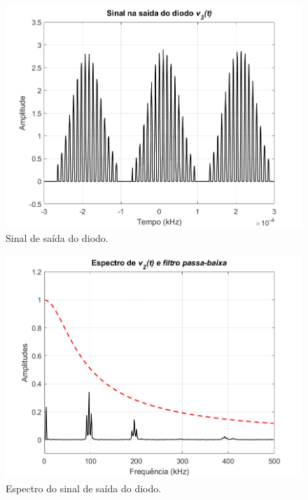 \documentclass[a4paper,12pt,oneside,openany,table,xcdraw]{article}
\begin{document}
\vspace{0.3cm}
\begin{figure}[H]
\centering
\includegraphics[width=\textwidth]{ex2_diodo_2}
\caption{Sinal de saída do diodo.}
\label{22:1}
\end{figure}

\vspace{0.3cm}
\begin{figure}[H]
\centering
\includegraphics[width=\textwidth]{ex2_espectro_diodo_2}
\caption{Espectro do sinal de saída do diodo.}
\label{22:2}
\end{figure}
\end{document}
